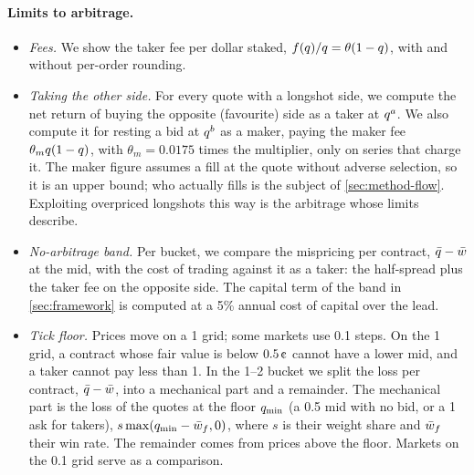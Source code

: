 \paragraph{Limits to arbitrage.}
\begin{itemize}
\item \emph{Fees.} We show the taker fee per dollar staked, $f(q)/q=\theta(1-q)$, with and
      without per-order rounding.
\item \emph{Taking the other side.} For every quote with a longshot side, we compute the net return
      of buying the opposite (favourite) side as a taker at $q^a$. We also compute it for resting a
      bid at $q^b$ as a maker, paying the maker fee $\theta_mq(1-q)$, with $\theta_m=0.0175$ times the
      multiplier, only on series that charge it. The maker figure assumes a fill at the quote without adverse selection, so it is an upper
      bound; who actually fills is the subject of \cref{sec:method-flow}. Exploiting overpriced
      longshots this way is the arbitrage whose limits \citet{shleifervishny1997} describe.
\item \emph{No-arbitrage band.} Per bucket, we compare the mispricing per contract, $\bar{q}-\bar{w}$
      at the mid, with the cost of trading against it as a taker: the half-spread plus the taker fee
      on the opposite side. The capital term of the band in \cref{sec:framework} is computed at a 5\%
      annual cost of capital over the lead.
\item \emph{Tick floor.} Prices move on a 1\cents{} grid; some markets use 0.1\cents{} steps. On the
      1\cents{} grid, a contract whose fair value is below $0.5\cents$ cannot have a lower mid, and a
      taker cannot pay less than 1\cents. In the 1--2\cents{} bucket we split the loss per contract,
      $\bar{q}-\bar{w}$, into a mechanical part and a remainder. The mechanical part is the loss of the
      quotes at the floor $q_{\min}$ (a 0.5\cents{} mid with no bid, or a 1\cents{} ask for takers),
      $s\max(q_{\min}-\bar{w}_{f},0)$, where $s$ is their weight share and $\bar{w}_{f}$ their win rate.
      The remainder comes from prices above the floor. Markets on the 0.1\cents{} grid serve as a
      comparison.
\end{itemize}

